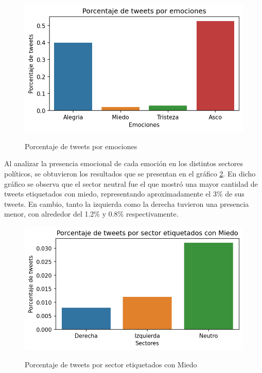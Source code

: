 \begin{figure}[h]
	\caption{Porcentaje de tweets por emociones}
	\centering
	\includegraphics{../Images/Results/Cantidad_de_tweets__por_emocion.png} 
	\label{figure:tweets_total}
\end{figure}



Al analizar la presencia emocional de cada emoción en los distintos sectores políticos, se obtuvieron los resultados que se presentan en el gráfico \ref{figure:tweets_percent_miedo}. En dicho gráfico se observa que el sector neutral fue el que mostró una mayor cantidad de tweets etiquetados con miedo, representando aproximadamente el 3\% de sus tweets. En cambio, tanto la izquierda como la derecha tuvieron una presencia menor, con alrededor del 1.2\% y 0.8\% respectivamente.








\begin{figure}[h]
	\caption{Porcentaje de tweets por sector etiquetados con Miedo}
	\centering
	\includegraphics{../Images/Results/Porcentaje de tweets por sector etiquetados con Miedo.png} 
	\label{figure:tweets_percent_miedo}
\end{figure}

